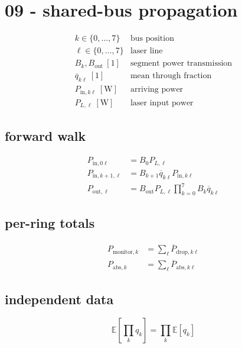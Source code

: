 \section*{09 - shared-bus propagation}

\[
\begin{array}{ll}k\in\{0,\ldots,7\}&\text{bus position}\\[0.6em]\ell\in\{0,\ldots,7\}&\text{laser line}\\[0.6em]B_k,B_{\mathrm{out}}\ [1]&\text{segment power transmission}\\[0.6em]\overline q_{k\ell}\ [1]&\text{mean through fraction}\\[0.6em]P_{\mathrm{in},k\ell}\ [\mathrm W]&\text{arriving power}\\[0.6em]P_{L,\ell}\ [\mathrm W]&\text{laser input power}\end{array}
\]

\subsection*{forward walk}
\[
\displaystyle \begin{aligned}P_{\mathrm{in},0\ell}&=B_0P_{L,\ell}\\P_{\mathrm{in},k+1,\ell}&=B_{k+1}\overline q_{k\ell}P_{\mathrm{in},k\ell}\\P_{\mathrm{out},\ell}&=B_{\mathrm{out}}P_{L,\ell}\prod_{k=0}^{7}B_k\overline q_{k\ell}\end{aligned}
\]

\subsection*{per-ring totals}
\[
\displaystyle \begin{aligned}P_{\mathrm{monitor},k}&=\sum_\ell\overline P_{\mathrm{drop},k\ell}\\P_{\mathrm{abs},k}&=\sum_\ell\overline P_{\mathrm{abs},k\ell}\end{aligned}
\]

\subsection*{independent data}
\[
\displaystyle \mathbb E\!\left[\prod_k q_k\right]=\prod_k\mathbb E[q_k]
\]
